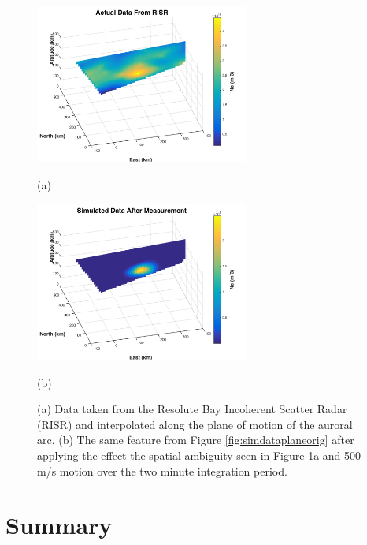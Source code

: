 \begin{figure}[htb]
  \begin{minipage}[t]{0.49\linewidth}\centering
    \includegraphics[width=7cm]{acdata}
    \medskip
    \centerline{(a)}
  \end{minipage}\hfill
  \begin{minipage}[t]{0.49\linewidth}\centering
    \includegraphics[width=7cm]{simdataplane}
    \medskip
    \centerline{(b)}
  \end{minipage}
  \caption{ (a) Data taken from the Resolute Bay Incoherent Scatter Radar (RISR) and interpolated along the plane of motion of the auroral arc. (b) The same feature from Figure \ref{fig:simdataplaneorig} after applying the effect the spatial ambiguity seen in Figure \ref{fig:realdataplane}a and 500 m/s motion over the two minute integration period.}
  \label{fig:realdataplane}
\end{figure}


\section{Summary}

